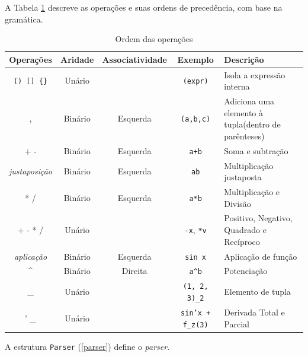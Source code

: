 A Tabela \ref{order} descreve as operações e suas ordens de precedência,
com base na gramática.

\begin{table}[ht]
\caption{Ordem das operações}
\label{order}
\begin{centering}
\begin{tabularx}{\textwidth}{||c|c|c|c|X||}
    \cline{1-5}
    Operações & Aridade & Associatividade & Exemplo & Descrição \\ \hline \hline

    \texttt{() [] \{\}} & Unário &  & \texttt{(expr)} & Isola a expressão interna \\ \hline

    , & Binário & Esquerda & \texttt{(a,b,c)} & Adiciona uma elemento à tupla(dentro de parênteses) \\ \hline

    + - & Binário & Esquerda & \texttt{a+b} & Soma e subtração \\ \hline

    \textit{justaposição} & Binário & Esquerda & \texttt{ab} & Multiplicação justaposta \\ \hline

    * / & Binário & Esquerda & \texttt{a*b} & Multiplicação e Divisão \\ \hline

    + - * / & Unário &  & \texttt{-x}, \texttt{*v} & Positivo, Negativo, Quadrado e Recíproco \\ \hline

    \textit{aplicação} & Binário & Esquerda & \texttt{sin x} & Aplicação de função \\ \hline

    \textasciicircum & Binário & Direita & \texttt{a\textasciicircum b} & Potenciação \\ \hline

    \_ & Unário & & \texttt{(1, 2, 3)\_2} & Elemento de tupla \\ \hline
    
    ' \_ & Unário & & \texttt{sin'x + f\_z(3)} & Derivada Total e Parcial \\ \hline
    \cline{1-5}
\end{tabularx}
\end{centering}
\end{table}

\newpage
A estrutura \texttt{Parser} (\ref{parser}) define o \textit{parser}.

\lstset{language=c++}

